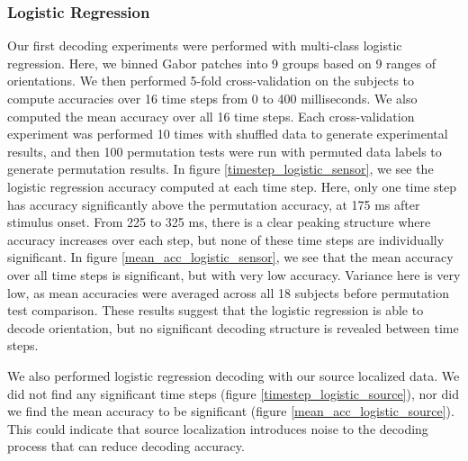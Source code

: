 \documentclass[../main.tex]{subfiles}
\begin{document}
\subsubsection{Logistic Regression}
Our first decoding experiments were performed with multi-class logistic regression. Here, we binned Gabor patches into 9 groups based on 9 ranges of orientations. We then performed 5-fold cross-validation on the subjects to compute accuracies over 16 time steps from 0 to 400 milliseconds. We also computed the mean accuracy over all 16 time steps. Each cross-validation experiment was performed 10 times with shuffled data to generate experimental results, and then 100 permutation tests were run with permuted data labels to generate permutation results. In figure \ref{timestep_logistic_sensor}, we see the logistic regression accuracy computed at each time step. Here, only one time step has accuracy significantly above the permutation accuracy, at 175 ms after stimulus onset. From 225 to 325 ms, there is a clear peaking structure where accuracy increases over each step, but none of these time steps are individually significant. In figure \ref{mean_acc_logistic_sensor}, we see that the mean accuracy over all time steps is significant, but with very low accuracy. Variance here is very low, as mean accuracies were averaged across all 18 subjects before permutation test comparison. These results suggest that the logistic regression is able to decode orientation, but no significant decoding structure is revealed between time steps. 

We also performed logistic regression decoding with our source localized data. We did not find any significant time steps (figure \ref{timestep_logistic_source}), nor did we find the mean accuracy to be significant (figure \ref{mean_acc_logistic_source}). This could indicate that source localization introduces noise to the decoding process that can reduce decoding accuracy.
\end{document}
